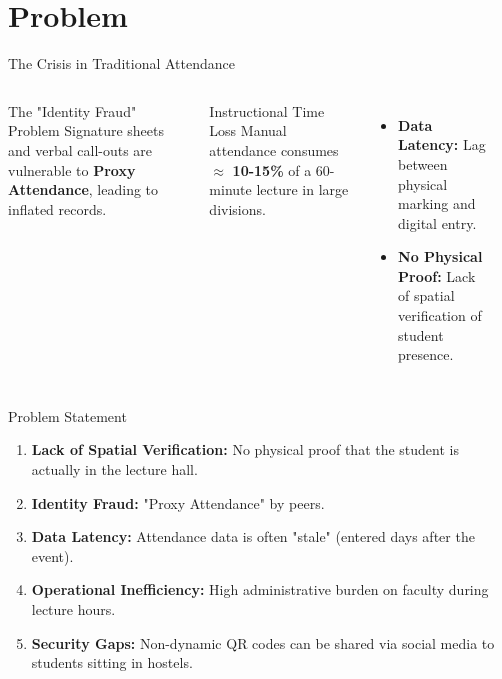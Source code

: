 \documentclass[11pt, aspectratio=169]{beamer}
\begin{document}
\section{Problem}
\begin{frame}{The Crisis in Traditional Attendance}
    \begin{columns}
        \begin{block}{The "Identity Fraud" Problem}
            Signature sheets and verbal call-outs are vulnerable to \textbf{Proxy Attendance}, leading to inflated records.
        \end{block}
        \begin{block}{Instructional Time Loss}
            Manual attendance consumes $\approx$ \textbf{10-15\%} of a 60-minute lecture in large divisions.
        \end{block}
        \begin{itemize}
            \item \textbf{Data Latency:} Lag between physical marking and digital entry.
            \item \textbf{No Physical Proof:} Lack of spatial verification of student presence.
        \end{itemize}
        \begin{center}
        \end{center}
    \end{columns}
\end{frame}

\begin{frame}{Problem Statement}
    \begin{enumerate}
        \item \textbf{Lack of Spatial Verification:} No physical proof that the student is actually in the lecture hall.
        \item \textbf{Identity Fraud:} "Proxy Attendance" by peers.
        \item \textbf{Data Latency:} Attendance data is often "stale" (entered days after the event).
        \item \textbf{Operational Inefficiency:} High administrative burden on faculty during lecture hours.
        \item \textbf{Security Gaps:} Non-dynamic QR codes can be shared via social media to students sitting in hostels.
    \end{enumerate}
\end{frame}
\end{document}
